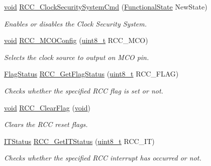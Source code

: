 \begin{DoxyCompactItemize}
\hyperlink{usb__devapi_8h_afabf60e7f57651d6d595a02c75f07cd0}{void} \hyperlink{group___r_c_c___private___functions_ga0ff1fd7b9a8a49cdda11b7d7261c3494}{R\+C\+C\+\_\+\+Clock\+Security\+System\+Cmd} (\hyperlink{agilefox_2library_2inc_2stm32f10x__type_8h_ac9a7e9a35d2513ec15c3b537aaa4fba1}{Functional\+State} New\+State)
\begin{DoxyCompactList}\small\item\em Enables or disables the Clock Security System. \end{DoxyCompactList}\item 
\hyperlink{usb__devapi_8h_afabf60e7f57651d6d595a02c75f07cd0}{void} \hyperlink{group___r_c_c___private___functions_ga8f62b86c6ca8ae6585ba1cec79431fe5}{R\+C\+C\+\_\+\+M\+C\+O\+Config} (\hyperlink{_p_e___types_8h_aba7bc1797add20fe3efdf37ced1182c5}{uint8\+\_\+t} R\+C\+C\+\_\+\+M\+CO)
\begin{DoxyCompactList}\small\item\em Selects the clock source to output on M\+CO pin. \end{DoxyCompactList}\item 
\hyperlink{agilefox_2library_2inc_2stm32f10x__type_8h_a89136caac2e14c55151f527ac02daaff}{Flag\+Status} \hyperlink{group___r_c_c___private___functions_ga2897bdc52f272031c44fb1f72205d295}{R\+C\+C\+\_\+\+Get\+Flag\+Status} (\hyperlink{_p_e___types_8h_aba7bc1797add20fe3efdf37ced1182c5}{uint8\+\_\+t} R\+C\+C\+\_\+\+F\+L\+AG)
\begin{DoxyCompactList}\small\item\em Checks whether the specified R\+CC flag is set or not. \end{DoxyCompactList}\item 
\hyperlink{usb__devapi_8h_afabf60e7f57651d6d595a02c75f07cd0}{void} \hyperlink{group___r_c_c___private___functions_ga53f909dbb15a54124419084ebda97d72}{R\+C\+C\+\_\+\+Clear\+Flag} (\hyperlink{usb__devapi_8h_afabf60e7f57651d6d595a02c75f07cd0}{void})
\begin{DoxyCompactList}\small\item\em Clears the R\+CC reset flags. \end{DoxyCompactList}\item 
\hyperlink{agilefox_2library_2inc_2stm32f10x__type_8h_aacbd7ed539db0aacd973a0f6eca34074}{I\+T\+Status} \hyperlink{group___r_c_c___private___functions_ga6126c99f398ee4be410ad76ae3aee18f}{R\+C\+C\+\_\+\+Get\+I\+T\+Status} (\hyperlink{_p_e___types_8h_aba7bc1797add20fe3efdf37ced1182c5}{uint8\+\_\+t} R\+C\+C\+\_\+\+IT)
\begin{DoxyCompactList}\small\item\em Checks whether the specified R\+CC interrupt has occurred or not. \end{DoxyCompactList}\item 

\end{DoxyCompactItemize}
